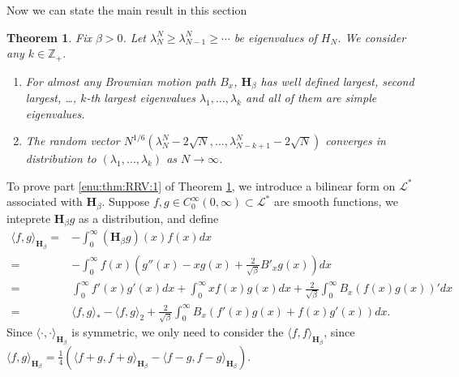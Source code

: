 \documentclass[11pt, a4paper]{article}
\numberwithin{equation}{section}
\newcommand{\intZ}{\mathbb{Z}}
\newcommand{\Lstar}{\mathcal{L}^*}
\newcommand{\Hbeta}{\mathbf{H}_{\beta}}
\newtheorem{thm}{Theorem}
\theoremstyle{definition}
\theoremstyle{remark}
\begin{document}
Now we can state the main result in this section
\begin{thm} \label{thm:RRV}
  Fix $\beta > 0$. Let $\lambda^N_N \geq \lambda^N_{N - 1} \geq \dotsb$ be eigenvalues of $H_N$. We consider any $k \in \intZ_+$.
  \begin{enumerate}
  \item \label{enu:thm:RRV:1}
    For almost any Brownian motion path $B_x$, $\Hbeta$ has well defined largest, second largest, \dots, $k$-th largest eigenvalues $\lambda_1, \dotsc, \lambda_k$ and all of them are simple eigenvalues.
  \item \label{enu:thm:RRV:2}
    The random vector $N^{1/6}(\lambda^N_N - 2\sqrt{N}, \dotsc, \lambda^N_{N - k + 1} - 2\sqrt{N})$ converges in distribution to $(\lambda_1, \dotsc, \lambda_k)$ as $N \to \infty$.
  \end{enumerate}
\end{thm}

To prove part \ref{enu:thm:RRV:1} of Theorem \ref{thm:RRV}, we introduce a bilinear form on $\Lstar$ associated with $\Hbeta$. Suppose $f, g \in C^{\infty}_0(0, \infty) \subset \Lstar$ are smooth functions, we inteprete $\Hbeta g$ as a distribution, and define
\begin{equation}
  \begin{split}
    \langle f, g \rangle_{\Hbeta} = {}& -\int^{\infty}_0 (\Hbeta g)(x) f(x) dx \\
    = {}& -\int^{\infty}_0 f(x) \left( g''(x) - xg(x) + \frac{2}{\sqrt{\beta}} B'_x g(x) \right) dx \\
    = {}& \int^{\infty}_0 f'(x) g'(x) dx + \int^{\infty}_0 xf(x)g(x) dx + \frac{2}{\sqrt{\beta}} \int^{\infty}_0 B_x (f(x) g(x))' dx\\
    = {}& \langle f, g \rangle_* - \langle f, g \rangle_2 + \frac{2}{\sqrt{\beta}} \int^{\infty}_0 B_x (f'(x) g(x) + f(x) g'(x)) dx.
  \end{split}
\end{equation}
Since $\langle \cdot, \cdot \rangle_{\Hbeta}$ is symmetric, we only need to consider the $\langle f, f \rangle_{\Hbeta}$, since $\langle f, g \rangle_{\Hbeta} = \frac{1}{4}(\langle f + g, f + g \rangle_{\Hbeta} - \langle f - g, f - g \rangle_{\Hbeta})$.
\end{document}
